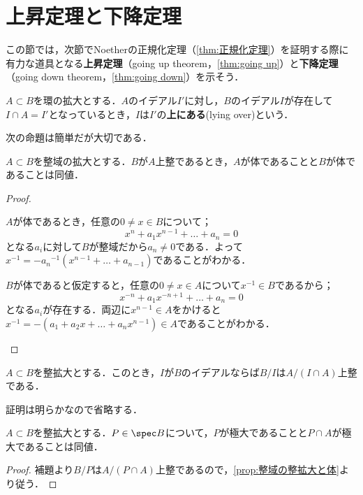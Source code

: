 \section{上昇定理と下降定理}
この節では，次節でNoetherの正規化定理（\ref{thm:正規化定理}）を証明する際に有力な道具となる\textbf{上昇定理}（going up theorem，\ref{thm:going up}）と\textbf{下降定理}（going down theorem，\ref{thm:going down}）を示そう．

\begin{defi}
	$A\subset B$を環の拡大とする．$A$のイデアル$I'$に対し，$B$のイデアル$I$が存在して$I\cap A=I'$となっているとき，$I$は$I'$の\textbf{上にある}(lying over)という．
\end{defi}

次の命題は簡単だが大切である．
\begin{prop}\label{prop:整域の整拡大と体}
	$A\subset B$を整域の拡大とする．$B$が$A$上整であるとき，$A$が体であることと$B$が体であることは同値．
\end{prop}

\begin{proof}
	\begin{eqv}
		\item $A$が体であるとき，任意の$0\neq x\in B$について；
		\[x^n+a_1x^{n-1}+\dots+a_n=0\]
		となる$a_i$に対して$B$が整域だから$a_n\neq0$である．よって$x^{-1}=-{a_n}^{-1}(x^{n-1}+\dots+a_{n-1})$であることがわかる．
		
		\item $B$が体であると仮定すると，任意の$0\neq x\in A$について$x^{-1}\in B$であるから；
		\[x^{-n}+a_1x^{-n+1}+\dots+a_n=0\]
		となる$a_i$が存在する．両辺に$x^{n-1}\in A$をかけると$x^{-1}=-(a_1+a_2x+\dots+a_nx^{n-1})\in A$であることがわかる．
	\end{eqv}
\end{proof}

\begin{lem}\label{lem:整従属は剰余環に落ちる}
	$A\subset B$を整拡大とする．このとき，$I$が$B$のイデアルならば$B/I$は$A/(I\cap A)$上整である．
\end{lem}

証明は明らかなので省略する．

\begin{prop}\label{prop:簡略版lying over theorem}
	$A\subset B$を整拡大とする．$P\in\spec B$について，$P$が極大であることと$P\cap A$が極大であることは同値．
\end{prop}

\begin{proof}
	補題より$B/P$は$A/(P\cap A)$上整であるので，\ref{prop:整域の整拡大と体}より従う．
\end{proof}

